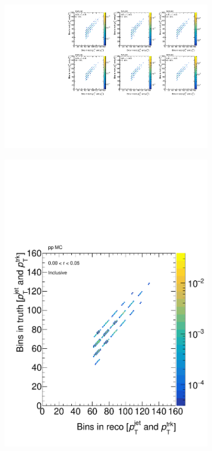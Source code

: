 \begin{figure}
\begin{subfigure}{0.7\textwidth}
\centering
\includegraphics[page=5, width=1\textwidth]{figures/main/corrections/resp_matrix_ChPS_PbPb_MC.pdf}
\caption{}
\label{fig:PbPb_ChPS_respmatrix}
\end{subfigure} 
\begin{subfigure}{0.30\textwidth}
\centering
\includegraphics[page=5, width=1\textwidth]{figures/main/corrections/resp_matrix_ChPS_pp_MC.pdf}

\end{subfigure}
\end{figure}
